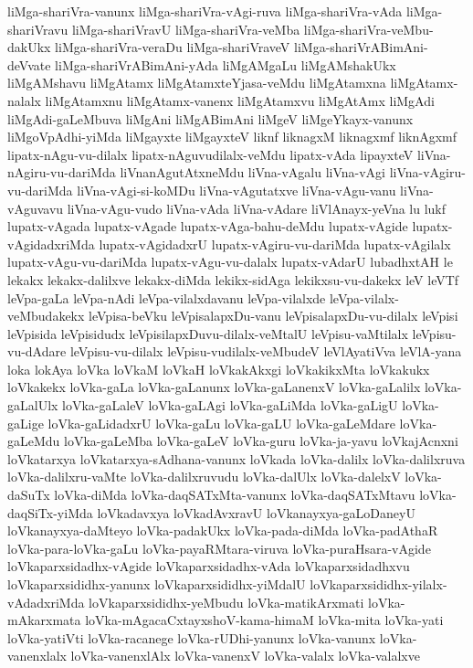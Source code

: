 {liMga-shariVra-vanunx
liMga-shariVra-vAgi-ruva
liMga-shariVra-vAda
liMga-shariVravu
liMga-shariVravU
liMga-shariVra-veMba
liMga-shariVra-veMbu-dakUkx
liMga-shariVra-veraDu
liMga-shariVraveV
liMga-shariVrABimAni-deVvate
liMga-shariVrABimAni-yAda
liMgAMgaLu
liMgAMshakUkx
liMgAMshavu
liMgAtamx
liMgAtamxteYjasa-veMdu
liMgAtamxna
liMgAtamx-nalalx
liMgAtamxnu
liMgAtamx-vanenx
liMgAtamxvu
liMgAtAmx
liMgAdi
liMgAdi-gaLeMbuva
liMgAni
liMgABimAni
liMgeV
liMgeYkayx-vanunx
liMgoVpAdhi-yiMda
liMgayxte
liMgayxteV
liknf
liknagxM
liknagxmf
liknAgxmf
lipatx-nAgu-vu-dilalx
lipatx-nAguvudilalx-veMdu
lipatx-vAda
lipayxteV
liVna-nAgiru-vu-dariMda
liVnanAgutAtxneMdu
liVna-vAgalu
liVna-vAgi
liVna-vAgiru-vu-dariMda
liVna-vAgi-si-koMDu
liVna-vAgutatxve
liVna-vAgu-vanu
liVna-vAguvavu
liVna-vAgu-vudo
liVna-vAda
liVna-vAdare
liVlAnayx-yeVna
lu
lukf
lupatx-vAgada
lupatx-vAgade
lupatx-vAga-bahu-deMdu
lupatx-vAgide
lupatx-vAgidadxriMda
lupatx-vAgidadxrU
lupatx-vAgiru-vu-dariMda
lupatx-vAgilalx
lupatx-vAgu-vu-dariMda
lupatx-vAgu-vu-dalalx
lupatx-vAdarU
lubadhxtAH
le
lekakx
lekakx-dalilxve
lekakx-diMda
lekikx-sidAga
lekikxsu-vu-dakekx
leV
leVTf
leVpa-gaLa
leVpa-nAdi
leVpa-vilalxdavanu
leVpa-vilalxde
leVpa-vilalx-veMbudakekx
leVpisa-beVku
leVpisalapxDu-vanu
leVpisalapxDu-vu-dilalx
leVpisi
leVpisida
leVpisidudx
leVpisilapxDuvu-dilalx-veMtalU
leVpisu-vaMtilalx
leVpisu-vu-dAdare
leVpisu-vu-dilalx
leVpisu-vudilalx-veMbudeV
leVlAyatiVva
leVlA-yana
loka
lokAya
loVka
loVkaM
loVkaH
loVkakAkxgi
loVkakikxMta
loVkakukx
loVkakekx
loVka-gaLa
loVka-gaLanunx
loVka-gaLanenxV
loVka-gaLalilx
loVka-gaLalUlx
loVka-gaLaleV
loVka-gaLAgi
loVka-gaLiMda
loVka-gaLigU
loVka-gaLige
loVka-gaLidadxrU
loVka-gaLu
loVka-gaLU
loVka-gaLeMdare
loVka-gaLeMdu
loVka-gaLeMba
loVka-gaLeV
loVka-guru
loVka-ja-yavu
loVkajAcnxni
loVkatarxya
loVkatarxya-sAdhana-vanunx
loVkada
loVka-dalilx
loVka-dalilxruva
loVka-dalilxru-vaMte
loVka-dalilxruvudu
loVka-dalUlx
loVka-dalelxV
loVka-daSuTx
loVka-diMda
loVka-daqSATxMta-vanunx
loVka-daqSATxMtavu
loVka-daqSiTx-yiMda
loVkadavxya
loVkadAvxravU
loVkanayxya-gaLoDaneyU
loVkanayxya-daMteyo
loVka-padakUkx
loVka-pada-diMda
loVka-padAthaR
loVka-para-loVka-gaLu
loVka-payaRMtara-viruva
loVka-puraHsara-vAgide
loVkaparxsidadhx-vAgide
loVkaparxsidadhx-vAda
loVkaparxsidadhxvu
loVkaparxsididhx-yanunx
loVkaparxsididhx-yiMdalU
loVkaparxsididhx-yilalx-vAdadxriMda
loVkaparxsididhx-yeMbudu
loVka-matikArxmati
loVka-mAkarxmata
loVka-mAgacaCxtayxshoV-kama-himaM
loVka-mita
loVka-yati
loVka-yatiVti
loVka-racanege
loVka-rUDhi-yanunx
loVka-vanunx
loVka-vanenxlalx
loVka-vanenxlAlx
loVka-vanenxV
loVka-valalx
loVka-valalxve
}
